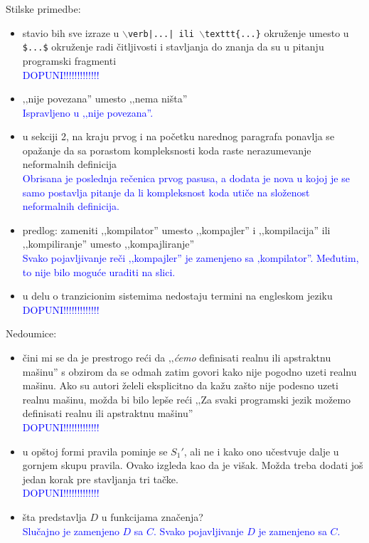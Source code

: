 \documentclass[a4paper]{report}
\newcommand{\odgovor}[1]{\textcolor{blue}{#1}}
\begin{document}
{Stilske primedbe:}
\begin{itemize}
	\item stavio bih sve izraze u {\tt $\backslash$verb|...| ili $\backslash$texttt\{...\}} okruženje umesto u {\tt \$...\$} okruženje radi čitljivosti i stavljanja do znanja da su u pitanju programski fragmenti\\
\odgovor{DOPUNI!!!!!!!!!!!!!}\\
	\item ‚‚nije povezana'' umesto ‚‚nema ništa''\\
	\odgovor{Ispravljeno u ‚‚nije povezana''.}
	\item u sekciji 2, na kraju prvog i na početku narednog paragrafa ponavlja se opažanje da sa porastom kompleksnosti koda raste nerazumevanje neformalnih definicija\\
	\odgovor{Obrisana je poslednja rečenica prvog pasusa, a dodata je nova u kojoj je se samo postavlja pitanje da li kompleksnost koda utiče na složenost neformalnih definicija.}
	\item predlog: zameniti ‚‚kompilator'' umesto ‚‚kompajler'' i ‚‚kompilacija'' ili ‚‚kompiliranje'' umesto ,,kompajliranje''\\
	 \odgovor{Svako pojavljivanje reči ‚‚kompajler'' je zamenjeno sa ‚kompilator''. Međutim, to nije bilo moguće uraditi na slici.}
	\item u delu o tranzicionim sistemima nedostaju termini na engleskom jeziku\\
\odgovor{DOPUNI!!!!!!!!!!!!!}\\
\end{itemize}

{Nedoumice:}
\begin{itemize}
	\item čini mi se da je prestrogo reći da ‚‚\textit{ćemo} definisati realnu ili apstraktnu mašinu'' s obzirom da se odmah zatim govori kako nije pogodno uzeti realnu mašinu. Ako su autori želeli eksplicitno da kažu zašto nije podesno uzeti realnu mašinu, možda bi bilo lepše reći ‚‚Za svaki programski jezik možemo definisati realnu ili apstraktnu mašinu''\\
\odgovor{DOPUNI!!!!!!!!!!!!!}\\
	\item u opštoj formi pravila pominje se $S_1'$, ali ne i kako ono učestvuje dalje u gornjem skupu pravila. Ovako izgleda kao da je višak. Možda treba dodati još jedan korak pre stavljanja tri tačke.\\
\odgovor{DOPUNI!!!!!!!!!!!!!}\\
	\item šta predstavlja $D$ u funkcijama značenja?\\
	\odgovor{Slučajno je zamenjeno $D$ sa $C$. Svako pojavljivanje $D$ je zamenjeno sa $C$.}
\end{itemize}
\end{document}
